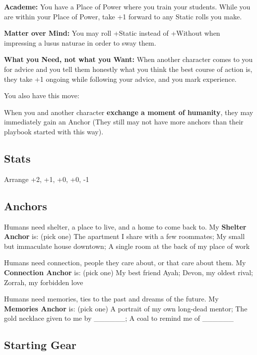 \documentclass[
]{memoir}
\begin{document}
\textbf{Academe:} You have a Place of Power where you train your
students. While you are within your Place of Power, take +1 forward to
any Static rolls you make.

\textbf{Matter over Mind:} You may roll +Static instead of +Without when
impressing a lusus naturae in order to sway them.

\textbf{What you Need, not what you Want:} When another character comes
to you for advice and you tell them honestly what you think the best
course of action is, they take +1 ongoing while following your advice,
and you mark experience.

You also have this move:

When you and another character \textbf{exchange a moment of humanity},
they may immediately gain an Anchor (They still may not have more
anchors than their playbook started with this way).

\hypertarget{stats-2}{%
\subsection{Stats}\label{stats-2}}

Arrange +2, +1, +0, +0, -1

\hypertarget{anchors-1}{%
\subsection{Anchors}\label{anchors-1}}

Humans need shelter, a place to live, and a home to come back to. My
\textbf{Shelter Anchor} is: (pick one) The apartment I share with a few
roommates; My small but immaculate house downtown; A single room at the
back of my place of work

Humans need connection, people they care about, or that care about them.
My \textbf{Connection Anchor} is: (pick one) My best friend Ayah; Devon,
my oldest rival; Zorrah, my forbidden love

Humans need memories, ties to the past and dreams of the future. My
\textbf{Memories Anchor} is: (pick one) A portrait of my own long-dead
mentor; The gold necklace given to me by \_\_\_\_\_\_; A coal to remind
me of \_\_\_\_\_\_

\hypertarget{starting-gear-1}{%
\subsection{Starting Gear}\label{starting-gear-1}}
\end{document}
